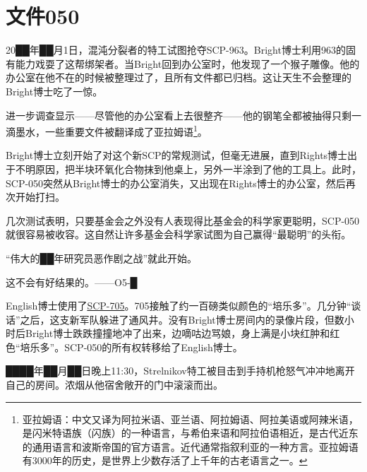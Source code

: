 \chapter{
    文件050
}

\label{chap:DOC-document-050}



20██年██月1日，混沌分裂者的特工试图抢夺SCP-963。Bright博士利用963的固有能力戏耍了这帮绑架者。当Bright回到办公室时，他发现了一个猴子雕像。他的办公室在他不在的时候被整理过了，且所有文件都已归档。这让天生不会整理的Bright博士吃了一惊。

进一步调查显示——尽管他的办公室看上去很整齐——他的钢笔全都被抽得只剩一滴墨水，一些重要文件被翻译成了亚拉姆语\footnote{亚拉姆语：中文又译为阿拉米语、亚兰语、阿拉姆语、阿拉美语或阿辣米语，是闪米特语族（闪族）的一种语言，与希伯来语和阿拉伯语相近，是古代近东的通用语言和波斯帝国的官方语言。近代通常指叙利亚的一种方言。亚拉姆语有3000年的历史，是世界上少数存活了上千年的古老语言之一。}。

Bright博士立刻开始了对这个新SCP的常规测试，但毫无进展，直到Rights博士出于不明原因，把半块环氧化合物抹到他桌上，另外一半涂到了他的工具上。此时，SCP-050突然从Bright博士的办公室消失，又出现在Rights博士的办公室，然后再次开始打扫。

几次测试表明，只要基金会之外没有人表现得比基金会的科学家更聪明，SCP-050就很容易被收容。这自然让许多基金会科学家试图为自己赢得“最聪明”的头衔。

“伟大的██年研究员恶作剧之战”就此开始。

\hr

这不会有好结果的。——O5-█

\hr



English博士使用了\hyperref[chap:SCP-705]{SCP-705}。705接触了约一百磅类似颜色的“培乐多”。几分钟“谈话”之后，这支新军队躲进了通风井。没有Bright博士房间内的录像片段，但数小时后Bright博士跌跌撞撞地冲了出来，边嘀咕边骂娘，身上满是小块红肿和红色“培乐多”。SCP-050的所有权转移给了English博士。



████年██月██日晚上11:30，Strelnikov特工被目击到手持机枪怒气冲冲地离开自己的房间。浓烟从他宿舍敞开的门中滚滚而出。

